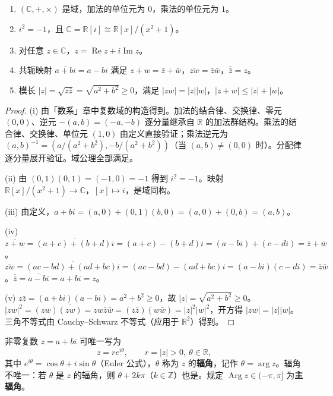 \begin{proposition}[复数域的基本性质]\label{prop:ca_complex_field_props}
\begin{enumerate}[label=(\roman*)]
    \item $(\mathbb{C}, +, \times)$ 是域，加法的单位元为 $0$，乘法的单位元为 $1$。
    \item $i^2 = -1$，且 $\mathbb{C} = \mathbb{R}[i] \cong \mathbb{R}[x]/(x^2+1)$。
    \item 对任意 $z \in \mathbb{C}$，$z = \operatorname{Re} z + i \operatorname{Im} z$。
    \item 共轭映射 $\overline{a+bi} = a - bi$ 满足 $\overline{z+w} = \bar{z} + \bar{w}$，$\overline{zw} = \bar{z} \bar{w}$，$\overline{\bar{z}} = z$。
    \item 模长 $|z| = \sqrt{z\bar{z}} = \sqrt{a^2 + b^2} \ge 0$，满足 $|zw| = |z| |w|$，$|z+w| \le |z| + |w|$。
\end{enumerate}
\end{proposition}

\begin{proof}
(i) 由「数系」章中复数域的构造得到。加法的结合律、交换律、零元 $(0,0)$、逆元 $-(a,b) = (-a,-b)$ 逐分量继承自 $\mathbb{R}$ 的加法群结构。乘法的结合律、交换律、单位元 $(1,0)$ 由定义直接验证；乘法逆元为 $(a,b)^{-1} = (a/(a^2+b^2), -b/(a^2+b^2))$（当 $(a,b) \neq (0,0)$ 时）。分配律逐分量展开验证。域公理全部满足。

(ii) 由 $(0,1)(0,1) = (-1,0) = -1$ 得到 $i^2 = -1$。映射 $\mathbb{R}[x]/(x^2+1) \to \mathbb{C}$，$[x] \mapsto i$，是域同构。

(iii) 由定义，$a + bi = (a,0) + (0,1)(b,0) = (a,0) + (0,b) = (a,b)$。

(iv) $\overline{z+w} = \overline{(a+c) + (b+d)i} = (a+c) - (b+d)i = (a - bi) + (c - di) = \bar{z} + \bar{w}$。$\overline{zw} = \overline{(ac-bd) + (ad+bc)i} = (ac-bd) - (ad+bc)i = (a-bi)(c-di) = \bar{z}\bar{w}$。$\overline{\bar{z}} = \overline{a-bi} = a+bi = z$。

(v) $z\bar{z} = (a+bi)(a-bi) = a^2 + b^2 \ge 0$，故 $|z| = \sqrt{a^2+b^2} \ge 0$。$|zw|^2 = (zw)\overline{(zw)} = zw\bar{z}\bar{w} = (z\bar{z})(w\bar{w}) = |z|^2|w|^2$，开方得 $|zw| = |z||w|$。三角不等式由 Cauchy--Schwarz 不等式（应用于 $\mathbb{R}^2$）得到。
\end{proof}

\begin{definition}[极坐标与辐角]\label{def:ca_polar_argument}
非零复数 $z = a + bi$ 可唯一写为
\[
z = r e^{i\theta}, \qquad r = |z| > 0,\ \theta \in \mathbb{R},
\]
其中 $e^{i\theta} = \cos\theta + i \sin\theta$（Euler 公式），$\theta$ 称为 $z$ 的\textbf{辐角}，记作 $\theta = \arg z$。辐角不唯一：若 $\theta$ 是 $z$ 的辐角，则 $\theta + 2k\pi$（$k \in \mathbb{Z}$）也是。规定 $\operatorname{Arg} z \in (-\pi, \pi]$ 为\textbf{主辐角}。
\end{definition}

